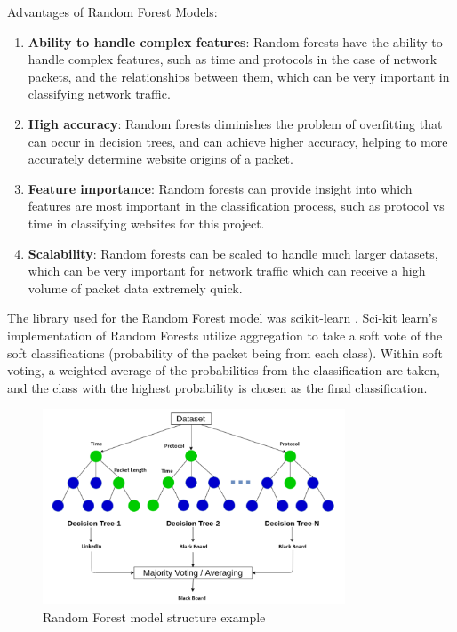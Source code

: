\documentclass[10pt,sigconf,letterpaper,nonacm]{acmart}
\begin{document}
Advantages of Random Forest Models:
\begin{enumerate}
  \item \textbf{Ability to handle complex features}: Random forests have the ability to handle complex features, such as time and protocols in the case of network packets, and the relationships between them, which can be very important in classifying network traffic.
  \item \textbf{High accuracy}: Random forests diminishes the problem of overfitting that can occur in decision trees, and can achieve higher accuracy, helping to more accurately determine website origins of a packet.
  \item \textbf{Feature importance}: Random forests can provide insight into which features are most important in the classification process, such as protocol vs time in classifying websites for this project.
  \item \textbf{Scalability}: Random forests can be scaled to handle much larger datasets, which can be very important for network traffic which can receive a high volume of packet data extremely quick.
\end{enumerate}

The library used for the Random Forest model was scikit-learn \cite{scikit-learn}. Sci-kit learn's implementation of Random Forests utilize aggregation to take a soft vote of the soft classifications (probability of the packet being from each class). Within soft voting, a weighted average of the probabilities from the classification are taken, and the class with the highest probability is chosen as the final classification.

\begin{figure}[h!]
  \centering
  \includegraphics[width=9cm]{Figures_and_Graphs/RandomForestExample.png}
  \caption{Random Forest model structure example}
  \label{fig:RFExample}
\end{figure}
\end{document}

